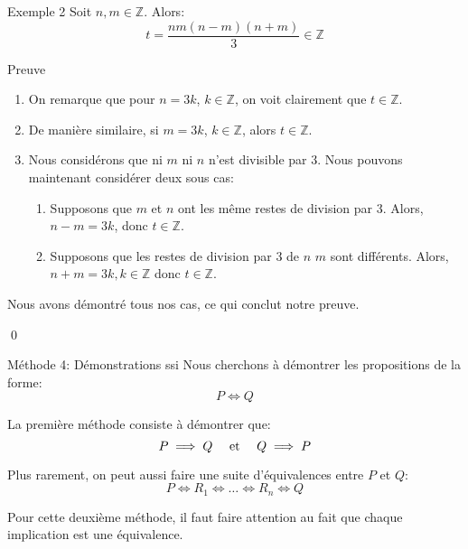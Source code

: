 \documentclass[a4paper]{article}
\begin{document}
\begin{parag}{Exemple 2}
    Soit $n, m \in \mathbb{Z}$. Alors: 
    \[t = \frac{nm\left(n - m\right)\left(n + m\right)}{3} \in \mathbb{Z}\]
     
    \begin{subparag}{Preuve}
        \begin{enumerate}[left=0pt]
            \item On remarque que pour $n = 3k$, $k \in \mathbb{Z}$, on voit clairement que $t \in \mathbb{Z}$.
            \item De manière similaire, si $m = 3k$, $k \in \mathbb{Z}$, alors $t \in \mathbb{Z}$.
            \item Nous considérons que ni $m$ ni $n$ n'est divisible par 3. Nous pouvons maintenant considérer deux sous cas: 
                \begin{enumerate}[left=0pt]
                    \item Supposons que $m$ et $n$ ont les même restes de division par 3. Alors, $n - m = 3k$, donc $t \in \mathbb{Z}$.
                    \item Supposons que les restes de division par 3 de $n$ $m$ sont différents. Alors, $n + m =  3k, k \in \mathbb{Z}$ donc $t \in \mathbb{Z}$.
                \end{enumerate}
        \end{enumerate}
        
         Nous avons démontré tous nos cas, ce qui conclut notre preuve.

         \qed
    \end{subparag}
\end{parag}

\begin{parag}{Méthode 4: Démonstrations ssi}
    Nous cherchons à démontrer les propositions de la forme: 
    \[P \iff Q\]
    
    La première méthode consiste à démontrer que: 
    \[P \implies Q \quad \text{ et } \quad Q \implies P\]
    
    Plus rarement, on peut aussi faire une suite d'équivalences entre $P$ et $Q$: 
    \[P \iff R_1 \iff \ldots \iff R_n \iff Q\]

    Pour cette deuxième méthode, il faut faire attention au fait que chaque implication est une équivalence.
\end{parag}
\end{document}
